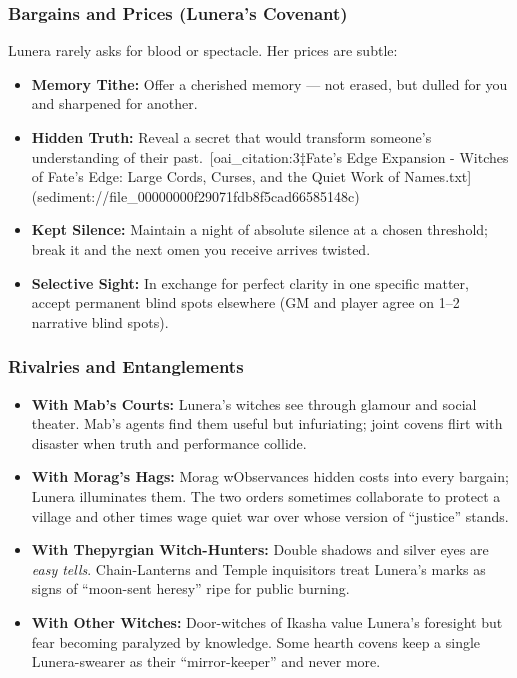 \documentclass[11pt]{book}
\begin{document}
\subsubsection{Bargains and Prices (Lunera's Covenant)}

Lunera rarely asks for blood or spectacle. Her prices are subtle:
\begin{itemize}[leftmargin=*]
  \item \textbf{Memory Tithe:} Offer a cherished memory --- not erased, but dulled for you and sharpened for another.
  \item \textbf{Hidden Truth:} Reveal a secret that would transform someone's understanding of their past.\ [oai_citation:3‡Fate's Edge Expansion - Witches of Fate's Edge: Large Cords, Curses, and the Quiet Work of Names.txt](sediment://file_00000000f29071fdb8f5cad66585148c)
  \item \textbf{Kept Silence:} Maintain a night of absolute silence at a chosen threshold; break it and the next omen you receive arrives twisted.
  \item \textbf{Selective Sight:} In exchange for perfect clarity in one specific matter, accept permanent blind spots elsewhere (GM and player agree on 1--2 narrative blind spots).
\end{itemize}

\subsubsection{Rivalries and Entanglements}

\begin{itemize}[leftmargin=*]
  \item \textbf{With Mab's Courts:} Lunera's witches see through glamour and social theater. Mab's agents find them useful but infuriating; joint covens flirt with disaster when truth and performance collide.
  \item \textbf{With Morag's Hags:} Morag wObservances hidden costs into every bargain; Lunera illuminates them. The two orders sometimes collaborate to protect a village and other times wage quiet war over whose version of ``justice'' stands.
  \item \textbf{With Thepyrgian Witch-Hunters:} Double shadows and silver eyes are \emph{easy tells}. Chain-Lanterns and Temple inquisitors treat Lunera's marks as signs of ``moon-sent heresy'' ripe for public burning.
  \item \textbf{With Other Witches:} Door-witches of Ikasha value Lunera's foresight but fear becoming paralyzed by knowledge. Some hearth covens keep a single Lunera-swearer as their ``mirror-keeper'' and never more.
\end{itemize}
\end{document}
